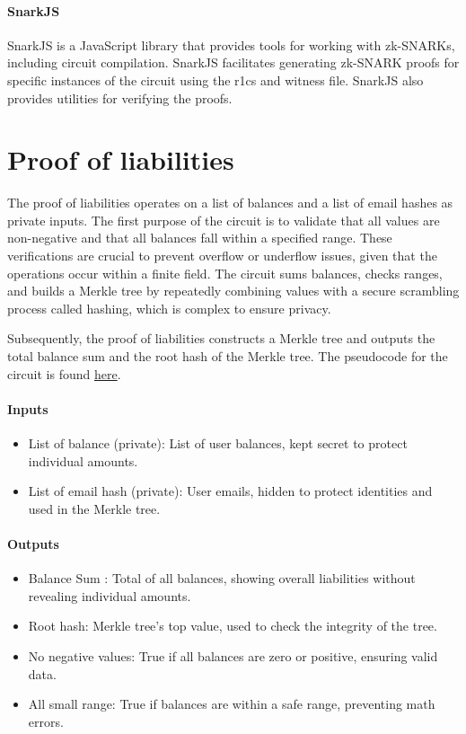 \paragraph{SnarkJS} 

SnarkJS is a JavaScript library that provides tools for working with zk-SNARKs, including circuit compilation.
SnarkJS facilitates generating zk-SNARK proofs for specific instances of the circuit using the r1cs and witness file.
SnarkJS also provides utilities for verifying the proofs.


\section{Proof of liabilities}
\label{subsec:pl}
The proof of liabilities operates on a list of balances and a list of email hashes as private inputs.
The first purpose of the circuit is to validate that all values are non-negative and that all balances fall within a specified range.
These verifications are crucial to prevent overflow or underflow issues, given that the operations occur within a finite field. 
The circuit sums balances, checks ranges, and builds a Merkle tree by repeatedly combining values with a secure scrambling process called hashing, which is complex to ensure privacy.

Subsequently, the proof of liabilities constructs a Merkle tree and outputs the total balance sum and the root hash of the Merkle tree.
The pseudocode for the circuit is found \hyperref[subsec:plc]{here}.


\paragraph{Inputs}
\begin{itemize}
   \item List of balance (private): List of user balances, kept secret to protect individual amounts.
   \item List of email hash (private): User emails, hidden to protect identities and used in the Merkle tree.
   \end{itemize}

\paragraph{Outputs}
\begin{itemize}
   \item Balance Sum : Total of all balances, showing overall liabilities without revealing individual amounts.
   \item Root hash: Merkle tree's top value, used to check the integrity of the tree.
   \item No negative values: True if all balances are zero or positive, ensuring valid data.
   \item All small range: True if balances are within a safe range, preventing math errors.
   \end{itemize}

